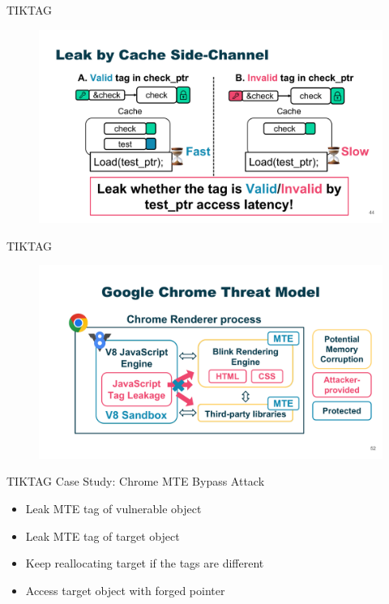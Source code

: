 \documentclass{beamer}
\begin{document}
\begin{frame}{TIKTAG\cite{tiktag}}
    \begin{figure}
        \begin{center}
            \includegraphics[width=1\textwidth]{img/mte-sc2.pdf}
        \end{center}
    \end{figure} 
\end{frame}

\begin{frame}{TIKTAG\cite{tiktag}}
    \begin{figure}
        \begin{center}
            \includegraphics[width=1\textwidth]{img/chrome.pdf}
        \end{center}
    \end{figure} 
\end{frame}

\begin{frame}{TIKTAG\cite{tiktag}}
    Case Study: Chrome MTE Bypass Attack
    \begin{itemize}
        \item Leak MTE tag of vulnerable object
        \item Leak MTE tag of target object
        \item Keep reallocating target if the tags are different
        \item Access target object with forged pointer
    \end{itemize}
\end{frame}
\end{document}
